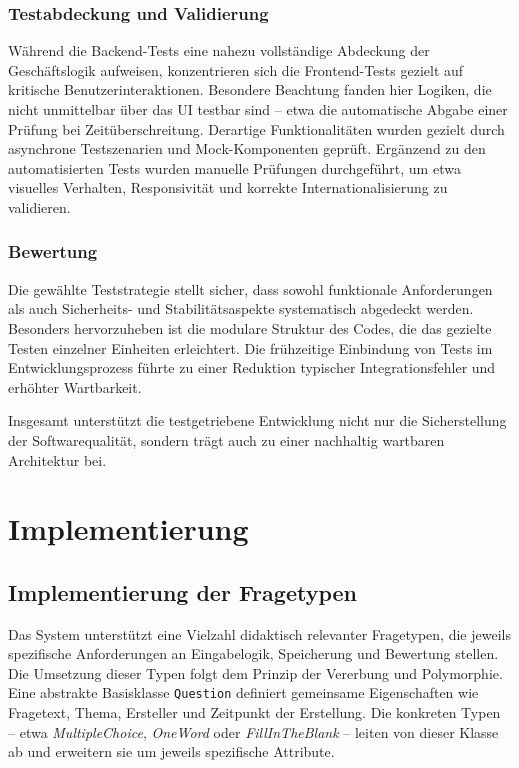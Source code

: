 \documentclass[a4paper,12pt]{article}
\begin{document}
\subsubsection{Testabdeckung und Validierung}
Während die Backend-Tests eine nahezu vollständige Abdeckung der Geschäftslogik aufweisen, konzentrieren sich die Frontend-Tests gezielt auf kritische Benutzerinteraktionen. Besondere Beachtung fanden hier Logiken, die nicht unmittelbar über das UI testbar sind – etwa die automatische Abgabe einer Prüfung bei Zeitüberschreitung. Derartige Funktionalitäten wurden gezielt durch asynchrone Testszenarien und Mock-Komponenten geprüft. Ergänzend zu den automatisierten Tests wurden manuelle Prüfungen durchgeführt, um etwa visuelles Verhalten, Responsivität und korrekte Internationalisierung zu validieren.

\subsubsection{Bewertung}
Die gewählte Teststrategie stellt sicher, dass sowohl funktionale Anforderungen als auch Sicherheits- und Stabilitätsaspekte systematisch abgedeckt werden. Besonders hervorzuheben ist die modulare Struktur des Codes, die das gezielte Testen einzelner Einheiten erleichtert. Die frühzeitige Einbindung von Tests im Entwicklungsprozess führte zu einer Reduktion typischer Integrationsfehler und erhöhter Wartbarkeit.

Insgesamt unterstützt die testgetriebene Entwicklung nicht nur die Sicherstellung der Softwarequalität, sondern trägt auch zu einer nachhaltig wartbaren Architektur bei.

\newpage

\section{Implementierung}
\subsection{Implementierung der Fragetypen}
Das System unterstützt eine Vielzahl didaktisch relevanter Fragetypen, die jeweils spezifische Anforderungen an Eingabelogik, Speicherung und Bewertung stellen. Die Umsetzung dieser Typen folgt dem Prinzip der Vererbung und Polymorphie. Eine abstrakte Basisklasse \texttt{Question} definiert gemeinsame Eigenschaften wie Fragetext, Thema, Ersteller und Zeitpunkt der Erstellung. Die konkreten Typen – etwa \textit{MultipleChoice}, \textit{OneWord} oder \textit{FillInTheBlank} – leiten von dieser Klasse ab und erweitern sie um jeweils spezifische Attribute.
\end{document}
